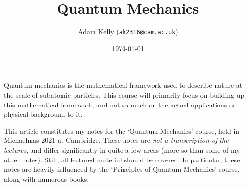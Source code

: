 \documentclass[a4paper]{scrartcl}
\title{Quantum Mechanics}
\author{Adam Kelly (\texttt{ak2316@cam.ac.uk})}
\date{\today}
\begin{document}
\maketitle


Quantum mechanics is the mathematical framework used to describe nature at the scale of subatomic particles. This course will primarily focus on building up this mathematical framework, and not so much on the actual applications or physical background to it.


This article constitutes my notes for the `Quantum Mechanics' course, held in Michaelmas 2021 at Cambridge. These notes are \emph{not a transcription of the lectures}, and differ significantly in quite a few areas (more so than some of my other notes). Still, all lectured material should be covered.
In particular, these notes are heavily influenced by the `Principles of Quantum Mechanics' course, along with numerous books.



\tableofcontents



\end{document}
